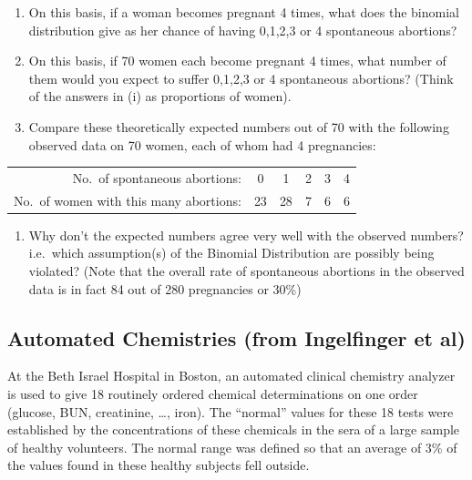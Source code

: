 \documentclass[]{book}
\providecommand{\tightlist}{%
  \setlength{\itemsep}{0pt}\setlength{\parskip}{0pt}}
\begin{document}
\begin{enumerate}
\def\labelenumi{\arabic{enumi}.}
\tightlist
\item
  On this basis, if a woman becomes pregnant 4 times, what does the binomial distribution give as her chance of having 0,1,2,3 or 4 spontaneous abortions?
\item
  On this basis, if 70 women each become pregnant 4 times, what number of them would you expect to suffer 0,1,2,3 or 4 spontaneous abortions? (Think of the answers in (i) as proportions of women).
\item
  Compare these theoretically expected numbers out of 70 with the following observed data on 70 women, each of whom had 4 pregnancies:
\end{enumerate}

\begin{longtable}[]{@{}rccccc@{}}
\toprule
\endhead
No.~of spontaneous abortions: & 0 & 1 & 2 & 3 & 4\tabularnewline
No.~of women with this many abortions: & 23 & 28 & 7 & 6 & 6\tabularnewline
\bottomrule
\end{longtable}

\begin{enumerate}
\def\labelenumi{\arabic{enumi}.}
\setcounter{enumi}{3}
\tightlist
\item
  Why don't the expected numbers agree very well with the observed numbers? i.e.~which assumption(s) of the Binomial Distribution are possibly being violated? (Note that the overall rate of spontaneous abortions in the observed data is in fact 84 out of 280 pregnancies or 30\%)
\end{enumerate}

\hypertarget{automated-chemistries-from-ingelfinger-et-al}{%
\subsection{Automated Chemistries (from Ingelfinger et al)}\label{automated-chemistries-from-ingelfinger-et-al}}

At the Beth Israel Hospital in Boston, an automated clinical chemistry analyzer is used to give 18 routinely ordered chemical determinations on one order (glucose, BUN, creatinine, \ldots{}, iron). The ``normal'' values for these 18 tests were established by the concentrations of these chemicals in the sera of a large sample of healthy volunteers. The normal range was defined so that an average of 3\% of the values found in these healthy subjects fell outside.
\end{document}
